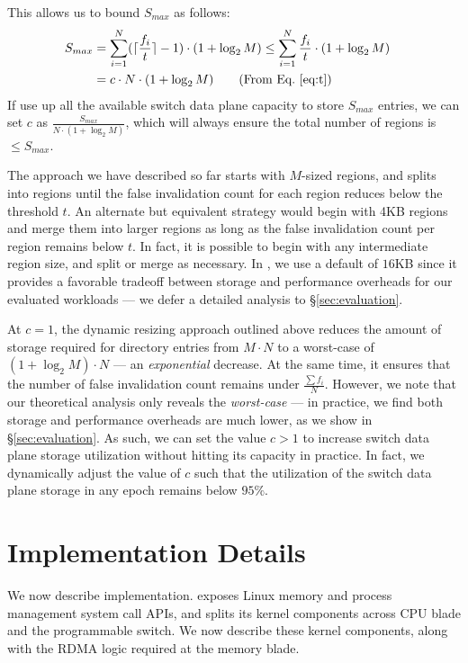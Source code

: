 This allows us to bound $S_{max}$ as follows:
\begin{align*}
  S_{max} &= \sum\limits_{i=1}^{N} (\lceil\frac{f_i}{t}\rceil - 1) \cdot (1+\log_2{M}) \leq \sum\limits_{i=1}^{N} \frac{f_i}{t} \cdot (1+\log_2{M})                &\\
          &= c \cdot N \cdot (1+\log_2{M}) \text{$\qquad$(From Eq.~\ref{eq:t})}
\end{align*}
\noindent
If use up all the available switch data plane capacity to store $S_{max}$ entries, we can set $c$ as $\frac{S_{max}}{N\cdot(1+\log_2{M})}$, which will always ensure the total number of regions is $\leq S_{max}$.

 The approach we have described so far starts with $M$-sized regions, and splits into regions until the false invalidation count for each region reduces below the threshold $t$. An alternate but equivalent strategy would begin with 4KB regions and merge them into larger regions as long as the false invalidation count per region remains below $t$. In fact, it is possible to begin with any intermediate region size, and split or merge as necessary. In \mind, we use a default of $16$KB since it provides a favorable tradeoff between storage and performance overheads for our evaluated workloads --- we defer a detailed analysis to \S\ref{sec:evaluation}.

 At $c=1$, the dynamic resizing approach outlined above reduces the amount of storage required for directory entries from $M\cdot N$ to a worst-case of $(1+\log_2{M})\cdot N$ --- an \textit{exponential} decrease. At the same time, it ensures that the number of false invalidation count remains under $\frac{\sum f_i}{N}$. However, we note that our theoretical analysis only reveals the \textit{worst-case} --- in practice, we find both storage and performance overheads are much lower, as we show in \S\ref{sec:evaluation}. As such, we can set the value $c > 1$ to increase switch data plane storage utilization without hitting its capacity in practice. In fact, we dynamically adjust the value of $c$ such that the utilization of the switch data plane storage in any epoch remains below $95\%$.

\section{Implementation Details}
\label{sec:impl}

We now describe \mind implementation. \mind exposes Linux memory and process management system call APIs, and splits its kernel components across CPU blade and the programmable switch. We now describe these kernel components, along with the RDMA logic required at the memory blade.

